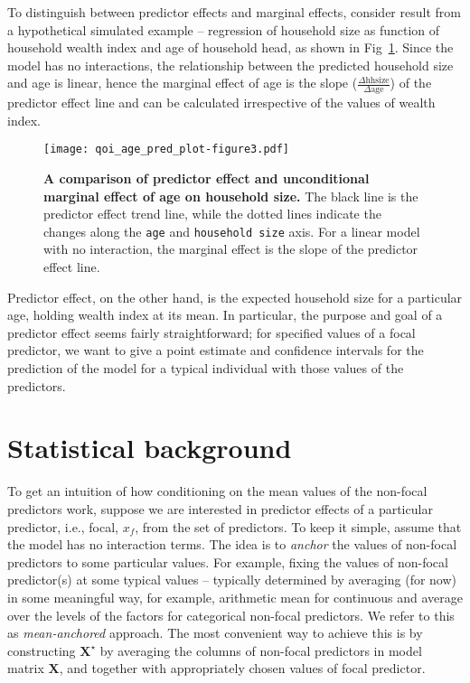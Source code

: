 \documentclass[10pt,letterpaper]{article}
\def\code#1{\texttt{#1}}
\newcommand{\bX}{{\mathbf X}}
\begin{document}
To distinguish between predictor effects and marginal effects, consider result from a hypothetical  simulated example -- regression of household size as function of household wealth index and age of household head, as shown in Fig~\ref{fig:qoi_age_pred_plot}. Since the model has no interactions, the relationship between the predicted household size and age is linear, hence the marginal effect of age is the slope ($\frac{\Delta \mathrm{hh size}}{\Delta \mathrm{age}}$) of the predictor effect line and can be calculated irrespective of the values of wealth index.

\begin{figure}[!h]
\centering
\texttt{[image: qoi\_age\_pred\_plot-figure3.pdf]}
\caption{{\bf A comparison of predictor effect and unconditional marginal effect of age on household size.} The black line is the predictor effect trend line, while the dotted lines indicate the changes along the \code{age} and \code{household size} axis. For a linear model with no interaction, the marginal effect is the slope of the predictor effect line.}
\label{fig:qoi_age_pred_plot}
\end{figure}

Predictor effect, on the other hand, is the expected household size for a particular age, holding wealth index at its mean. In particular, the purpose and goal of a predictor effect seems fairly straightforward; for specified values of a focal predictor, we want to give a point estimate and confidence intervals for the prediction of the model for a typical individual with those values of the predictors.

\section*{Statistical background}

To get an intuition of how conditioning on the mean values of the non-focal predictors work, suppose we are interested in predictor effects of a particular predictor, i.e., focal, $x_f$, from the set of predictors. To keep it simple, assume that the model has no interaction terms. The idea is to \emph{anchor} the values of non-focal predictors to some particular values. For example, fixing the values of non-focal predictor(s) at some typical values -- typically determined by averaging (for now) in some meaningful way, for example, arithmetic mean  for continuous and average over the levels of the factors for categorical non-focal predictors. We refer to this as \emph{mean-anchored} approach. The most convenient way to achieve this is by constructing $\bX^\star$ by averaging the columns of non-focal predictors in model matrix $\bX$, and together with appropriately chosen values of focal predictor.
\end{document}
